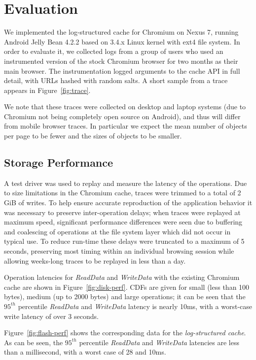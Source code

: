 \documentclass[letterpaper,twocolumn,10pt]{article}
\begin{document}
\section{Evaluation}

We implemented the log-structured cache for Chromium on Nexus 7, running Android
Jelly Bean 4.2.2 based on 3.4.x Linux kernel with ext4 file system.  In order to
evaluate it, we collected logs from a group of users who used an instrumented
version of the stock Chromium browser for two months as their main browser.  The
instrumentation logged arguments to the cache API in full detail, with URLs
hashed with random salts.  A short sample from a trace appears in
Figure~\ref{fig:trace}. 

We note that these traces were collected on desktop and laptop systems (due to
Chromium not being completely open source on Android), and thus will differ from
mobile browser traces. In particular we expect the mean number of objects per
page to be fewer and the sizes of objects to be smaller.

\subsection{Storage Performance}

A test driver was used to replay and measure the latency of the operations. 
Due to size limitations in the Chromium cache, traces were trimmed to a total of
2\,GiB of writes. To
help ensure accurate reproduction of the application behavior it was
necessary to preserve inter-operation delays; when traces were
replayed at maximum speed, significant performance differences were
seen due to buffering and coalescing of operations at the file system
layer which did not occur in typical use. To reduce run-time these
delays were truncated to a maximum of 5 seconds, preserving most timing
within an individual browsing session while allowing weeks-long traces
to be replayed in less than a day.

Operation latencies for  \emph{ReadData} and \emph{WriteData} with the
existing Chromium cache are shown in Figure~\ref{fig:disk-perf}. CDFs
are given for small (less than 100 bytes), medium (up to 2000 bytes) and
large operations; it can be seen that the $95^{th}$ percentile
\emph{ReadData} and \emph{WriteData} latency is nearly 10ms, with a
worst-case write latency of over 3 seconds. 

Figure~\ref{fig:flash-perf} shows the corresponding data for the
\emph{log-structured cache}.  As can be seen, the $95^{th}$ percentile
\emph{ReadData} and \emph{WriteData} latencies are less than a millisecond, with
a worst case of 28 and 10ms.
\end{document}
